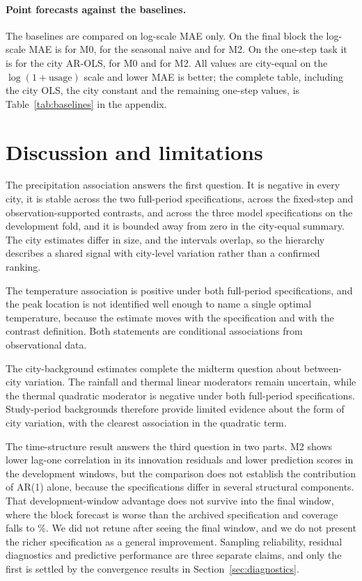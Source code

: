 \documentclass{article}
\begin{document}
\paragraph{Point forecasts against the baselines.}
The baselines are compared on log-scale MAE only. On the final block the log-scale MAE is
\MZeroFinalMaeBlock{} for M0, \BaseNaiveFinalMaeBlock{} for the seasonal naive and
\MTwoFinalMaeBlock{} for M2. On the one-step task it is \BaseArOlsFinalMaeStep{} for the city AR-OLS,
\MZeroFinalMaeStep{} for M0 and \MTwoFinalMaeStep{} for M2. All values are city-equal on the
$\log(1+\text{usage})$ scale and lower MAE is better; the complete table, including the city OLS, the
city constant and the remaining one-step values, is Table~\ref{tab:baselines} in the appendix.

\section{Discussion and limitations}

The precipitation association answers the first question. It is negative in every city, it is stable
across the two full-period specifications, across the fixed-step and observation-supported contrasts,
and across the three model specifications on the development fold, and it is bounded away from zero
in the city-equal summary. The city estimates differ in size, and the intervals overlap, so the
hierarchy describes a shared signal with city-level variation rather than a confirmed ranking.

The temperature association is positive under both full-period specifications, and the peak
location is not identified well enough to name a
single optimal temperature, because the estimate moves with the specification and with the contrast
definition. Both statements are conditional associations from observational data.

The city-background estimates complete the midterm question about between-city variation. The
rainfall and thermal linear moderators remain uncertain, while the thermal quadratic moderator is
negative under both full-period specifications. Study-period backgrounds therefore provide limited
evidence about the form of city variation, with the clearest association in the quadratic term.

The time-structure result answers the third question in two parts. M2 shows lower lag-one correlation
in its innovation residuals and lower prediction scores in the development windows, but the
comparison does not establish the contribution of AR(1) alone, because the specifications differ in
several structural components. That development-window advantage does not survive into the final
window, where the block forecast is worse than the archived specification and coverage falls to
\MTwoFinalBlockCov\%. We did not retune after seeing the final window, and we do not present the
richer specification as a general improvement. Sampling reliability, residual diagnostics and
predictive performance are three separate claims, and only the first is settled by the convergence
results in Section~\ref{sec:diagnostics}.
\end{document}
